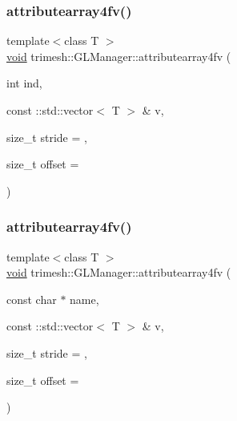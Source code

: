 \subsubsection{\texorpdfstring{attributearray4fv()}{attributearray4fv()}\hspace{0.1cm}{\footnotesize\ttfamily [3/6]}}
{\footnotesize\ttfamily template$<$class T $>$ \\
\hyperlink{namespacetrimesh_a784ddfd979e1c579bda795a8edfc3f43}{void} trimesh\+::\+G\+L\+Manager\+::attributearray4fv (\begin{DoxyParamCaption}\item[{int}]{ind,  }\item[{const \+::std\+::vector$<$ T $>$ \&}]{v,  }\item[{size\+\_\+t}]{stride = {},  }\item[{size\+\_\+t}]{offset = {} }\end{DoxyParamCaption})\hspace{0.3cm}{\ttfamily [inline]}}

\mbox{\label{classtrimesh_1_1GLManager_acc0e500a08ca51a6cd129be1ae9222d0}} 
\subsubsection{\texorpdfstring{attributearray4fv()}{attributearray4fv()}\hspace{0.1cm}{\footnotesize\ttfamily [4/6]}}
{\footnotesize\ttfamily template$<$class T $>$ \\
\hyperlink{namespacetrimesh_a784ddfd979e1c579bda795a8edfc3f43}{void} trimesh\+::\+G\+L\+Manager\+::attributearray4fv (\begin{DoxyParamCaption}\item[{const char $\ast$}]{name,  }\item[{const \+::std\+::vector$<$ T $>$ \&}]{v,  }\item[{size\+\_\+t}]{stride = {},  }\item[{size\+\_\+t}]{offset = {} }\end{DoxyParamCaption})\hspace{0.3cm}{\ttfamily [inline]}}

\mbox{\label{classtrimesh_1_1GLManager_a56b73d1848ed6f24f3f3cf7e6d7c84ee}} 
